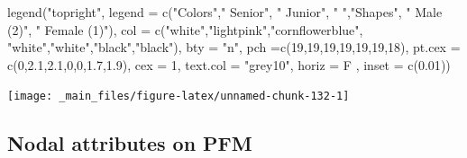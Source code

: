 \documentclass[
  notitlepage,
  onecolumn,
  openany]{book}
\newenvironment{Shaded}{\begin{snugshade}}{\end{snugshade}}
\newcommand{\AttributeTok}[1]{\textcolor[rgb]{0.77,0.63,0.00}{#1}}
\newcommand{\DecValTok}[1]{\textcolor[rgb]{0.00,0.00,0.81}{#1}}
\newcommand{\FloatTok}[1]{\textcolor[rgb]{0.00,0.00,0.81}{#1}}
\newcommand{\FunctionTok}[1]{\textcolor[rgb]{0.00,0.00,0.00}{#1}}
\newcommand{\NormalTok}[1]{#1}
\newcommand{\StringTok}[1]{\textcolor[rgb]{0.31,0.60,0.02}{#1}}
\begin{document}
\begin{Shaded}
\begin{Highlighting}[]
\FunctionTok{legend}\NormalTok{(}\StringTok{"topright"}\NormalTok{,}
       \AttributeTok{legend =} \FunctionTok{c}\NormalTok{(}\StringTok{"Colors"}\NormalTok{,}\StringTok{" Senior"}\NormalTok{, }\StringTok{" Junior"}\NormalTok{,}
                  \StringTok{" "}\NormalTok{,}\StringTok{"Shapes"}\NormalTok{, }\StringTok{" Male (2)"}\NormalTok{, }\StringTok{" Female (1)"}\NormalTok{),}
       \AttributeTok{col =} \FunctionTok{c}\NormalTok{(}\StringTok{"white"}\NormalTok{,}\StringTok{"lightpink"}\NormalTok{,}\StringTok{"cornflowerblue"}\NormalTok{,}
               \StringTok{"white"}\NormalTok{,}\StringTok{"white"}\NormalTok{,}\StringTok{"black"}\NormalTok{,}\StringTok{"black"}\NormalTok{), }
       \AttributeTok{bty =} \StringTok{"n"}\NormalTok{, }\AttributeTok{pch =}\FunctionTok{c}\NormalTok{(}\DecValTok{19}\NormalTok{,}\DecValTok{19}\NormalTok{,}\DecValTok{19}\NormalTok{,}\DecValTok{19}\NormalTok{,}\DecValTok{19}\NormalTok{,}\DecValTok{19}\NormalTok{,}\DecValTok{18}\NormalTok{),}
       \AttributeTok{pt.cex =} \FunctionTok{c}\NormalTok{(}\DecValTok{0}\NormalTok{,}\FloatTok{2.1}\NormalTok{,}\FloatTok{2.1}\NormalTok{,}\DecValTok{0}\NormalTok{,}\DecValTok{0}\NormalTok{,}\FloatTok{1.7}\NormalTok{,}\FloatTok{1.9}\NormalTok{), }
       \AttributeTok{cex =} \DecValTok{1}\NormalTok{, }
       \AttributeTok{text.col =} \StringTok{"grey10"}\NormalTok{, }
       \AttributeTok{horiz =}\NormalTok{ F , }
       \AttributeTok{inset =} \FunctionTok{c}\NormalTok{(}\FloatTok{0.01}\NormalTok{))}
\end{Highlighting}
\end{Shaded}

\begin{center}\texttt{[image: \_main\_files/figure-latex/unnamed-chunk-132-1]} \end{center}

\hypertarget{nodal-attributes-on-pfm}{%
\subsection{Nodal attributes on PFM}\label{nodal-attributes-on-pfm}}
\end{document}

